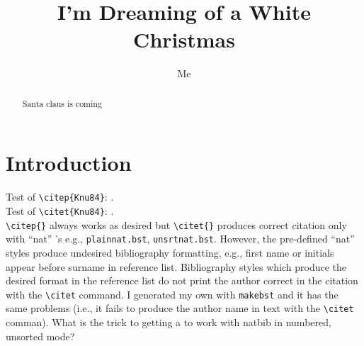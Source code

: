 \documentclass[twoside,12pt]{article}
\begin{document}
\title{I'm Dreaming of a White Christmas}
\author{Me}
\begin{abstract}
Santa claus is coming
\end{abstract}

\section{Introduction}

Test of \verb'\citep{Knu84}': \citep{Knu84}.\\
Test of \verb'\citet{Knu84}': \citet{Knu84}.\\
\verb'\citep{}' always works as desired but \verb'\citet{}' produces
correct citation only with ``nat'' \verb'''s e.g.,
\texttt{plainnat.bst}, \texttt{unsrtnat.bst}.   
However, the pre-defined ``nat'' styles produce undesired bibliography
formatting,  e.g., first name or initials appear before surname in
reference list. 
Bibliography styles which produce the desired format in the reference
list do not print the author correct in the citation with the
\verb'\citet' command.
I generated my own \verb'' with \verb'makebst' and
it has the same problems (i.e., it fails to produce the author name in
text with the \verb'\citet' comman).
What is the trick to getting a \verb'' to work with 
\textsf{natbib} in numbered, unsorted mode?


\end{document}
